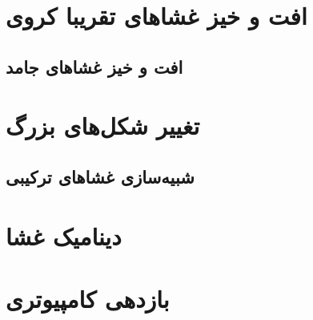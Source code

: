 \section{\label{sec:resultsBendingFluctuations}
افت و خیز غشا‌های تقریبا کروی
}


\subsection{
افت و خیز غشا‌های جامد
}


\section{\label{sec:larger shape changes}
تغییر شکل‌های بزرگ
}


\subsection{\label{sec:hybrid}
شبیه‌سازی غشاهای ترکیبی
}


\section{\label{sec:dynamics}
دینامیک غشا
}


\section{\label{sec:computational efficiency}
بازدهی کامپیوتری
}




